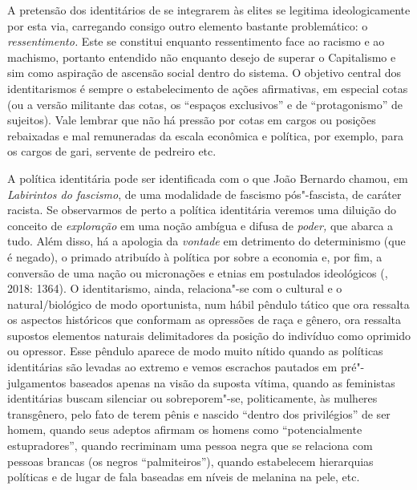 A pretensão dos identitários de se integrarem às elites se legitima
ideologicamente por esta via, carregando consigo outro elemento bastante
problemático: o \emph{ressentimento.} Este se constitui enquanto
ressentimento face ao racismo e ao machismo, portanto entendido não
enquanto desejo de superar o Capitalismo e sim como aspiração de
ascensão social dentro do sistema. O objetivo central dos identitarismos
é sempre o estabelecimento de ações afirmativas, em especial cotas (ou a
versão militante das cotas, os ``espaços exclusivos'' e de
``protagonismo'' de sujeitos). Vale lembrar que não há pressão por cotas
em cargos ou posições rebaixadas e mal remuneradas da escala econômica e
política, por exemplo, para os cargos de gari, servente de pedreiro etc.

A política identitária pode ser identificada com o que João Bernardo
chamou, em \emph{Labirintos do fascismo}, de uma modalidade de fascismo
pós"-fascista, de caráter racista. Se observarmos de perto a política
identitária veremos uma diluição do conceito de \emph{exploração} em uma
noção ambígua e difusa de \emph{poder,} que abarca a tudo. Além disso,
há a apologia da \emph{vontade} em detrimento do determinismo (que é
negado), o primado atribuído à política por sobre a economia e, por fim,
a conversão de uma nação ou micronações e etnias em postulados
ideológicos (, 2018: 1364). O identitarismo, ainda, relaciona"-se
com o cultural e o natural/biológico de modo oportunista, num hábil
pêndulo tático que ora ressalta os aspectos históricos que conformam as
opressões de raça e gênero, ora ressalta supostos elementos naturais
delimitadores da posição do indivíduo como oprimido ou opressor. Esse
pêndulo aparece de modo muito nítido quando as políticas identitárias
são levadas ao extremo e vemos escrachos pautados em pré"-julgamentos
baseados apenas na visão da suposta vítima, quando as feministas
identitárias buscam silenciar ou sobreporem"-se, politicamente, às
mulheres transgênero, pelo fato de terem pênis e nascido ``dentro dos
privilégios'' de ser homem, quando seus adeptos afirmam os homens como
``potencialmente estupradores'', quando recriminam uma pessoa negra que
se relaciona com pessoas brancas (os negros ``palmiteiros''), quando
estabelecem hierarquias políticas e de lugar de fala baseadas em níveis
de melanina na pele, etc.

